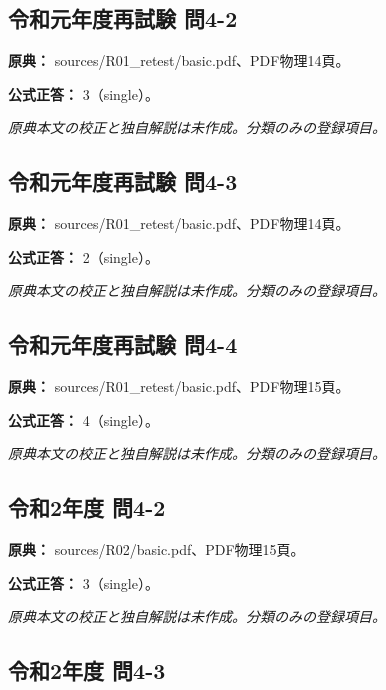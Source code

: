 \subsection{令和元年度再試験 問4-2}
\label{q:r01-ret-basic-4-2}

\noindent\textbf{原典：} sources/R01\_retest/basic.pdf、PDF物理14頁。

\textbf{公式正答：} 3（single）。

\par\textit{原典本文の校正と独自解説は未作成。分類のみの登録項目。}

\subsection{令和元年度再試験 問4-3}
\label{q:r01-ret-basic-4-3}

\noindent\textbf{原典：} sources/R01\_retest/basic.pdf、PDF物理14頁。

\textbf{公式正答：} 2（single）。

\par\textit{原典本文の校正と独自解説は未作成。分類のみの登録項目。}

\subsection{令和元年度再試験 問4-4}
\label{q:r01-ret-basic-4-4}

\noindent\textbf{原典：} sources/R01\_retest/basic.pdf、PDF物理15頁。

\textbf{公式正答：} 4（single）。

\par\textit{原典本文の校正と独自解説は未作成。分類のみの登録項目。}

\subsection{令和2年度 問4-2}
\label{q:r02-reg-basic-4-2}

\noindent\textbf{原典：} sources/R02/basic.pdf、PDF物理15頁。

\textbf{公式正答：} 3（single）。

\par\textit{原典本文の校正と独自解説は未作成。分類のみの登録項目。}

\subsection{令和2年度 問4-3}
\label{q:r02-reg-basic-4-3}

